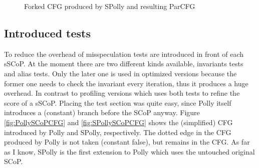 \lstset{frame=none}
\begin{figure}[htbp]
  \centering
  \subfloat[source]{
    
    \label{lst:ForkJoinCodeGenerationSRC}
  }
  \qquad

  \qquad
  \caption{Forked CFG produced by SPolly and resulting ParCFG}
  \label{fig:CreateParCFG}  
\end{figure}
\resetlst

\begin{shaded}
\subsection{Introduced tests}
To reduce the overhead of misspeculation tests are introduced in front of
each sSCoP. At the moment there are two different kinds available, 
invariants tests and alias tests. Only the later one is used in optimized 
versions because the former one needs to check the invariant
every iteration, thus it produces a huge overhead. In contrast to profiling 
versions which uses both tests to refine the score of a sSCoP.
Placing the test section was quite easy, since
Polly itself introduces a (constant) branch before the SCoP anyway. Figure
\ref{fig:PollySCoPCFG} and \ref{fig:SPollySCoPCFG} shows the (simplified) 
CFG introduced by Polly and SPolly, respectively. The dotted edge in the CFG
produced by Polly is not taken (constant false), but remains in the CFG. As far
as I know, SPolly is the first extension to Polly which uses the untouched 
original SCoP.

\end{shaded}


